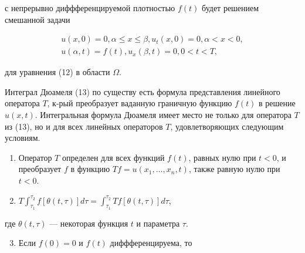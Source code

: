 \documentclass[10pt]{article}
\begin{document}
с непрерывно диффференцируемой плотностью $f(t)$ будет решением смешанной задачи



\[

\begin{gathered}

u(x, 0)=0, \alpha \leqslant x \leqslant \beta, u_{t}(x, 0)=0, \alpha<x<0, \\

u(\alpha, t)=f(t), u_{x}(\beta, t)=0,0<t<T,

\end{gathered}

\]



для уравнения (12) в области $\Omega$.



Интеграл Дюамеля (13) по существу есть формула представления линейного оператора $T$, к-рый преобразует ваданную граничную функцию $f(t)$ в решение $u(x, t)$. Интегральная формула Дюамеля имеет место не только для оператора $T$ из (13), но и для всех линейных операторов $T$, удовлетворяющих следующим условиям.



\begin{enumerate}

  \item Оператор $T$ определен для всех функций $f(t)$, равных нулю при $t<0$, и преобразует $f$ в функцию $T f=u\left(x_{1}, \ldots, x_{n}, t\right)$, также равную нулю при $t<0$.



  \item $T \int_{\tau_{1}}^{\tau_{2}} f[\theta(t, \tau)] d \tau=\int_{\tau_{1}}^{\tau_{2}} T f[\theta(t, \tau)] d \tau$,



\end{enumerate}



где $\theta(t, \tau)$ — некоторая функция $t$ и параметра $\tau$.



\begin{enumerate}

  \setcounter{enumi}{2}

  \item Если $f(0)=0$ и $f(t)$ диффференцируема, то

\end{enumerate}
\end{document}
